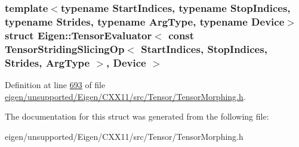 \subsubsection*{template$<$typename Start\+Indices, typename Stop\+Indices, typename Strides, typename Arg\+Type, typename Device$>$\newline
struct Eigen\+::\+Tensor\+Evaluator$<$ const Tensor\+Striding\+Slicing\+Op$<$ Start\+Indices, Stop\+Indices, Strides, Arg\+Type $>$, Device $>$}



Definition at line \hyperlink{eigen_2unsupported_2_eigen_2_c_x_x11_2src_2_tensor_2_tensor_morphing_8h_source_l00693}{693} of file \hyperlink{eigen_2unsupported_2_eigen_2_c_x_x11_2src_2_tensor_2_tensor_morphing_8h_source}{eigen/unsupported/\+Eigen/\+C\+X\+X11/src/\+Tensor/\+Tensor\+Morphing.\+h}.



The documentation for this struct was generated from the following file\+:\begin{DoxyCompactItemize}
\item 
eigen/unsupported/\+Eigen/\+C\+X\+X11/src/\+Tensor/\+Tensor\+Morphing.\+h\end{DoxyCompactItemize}
